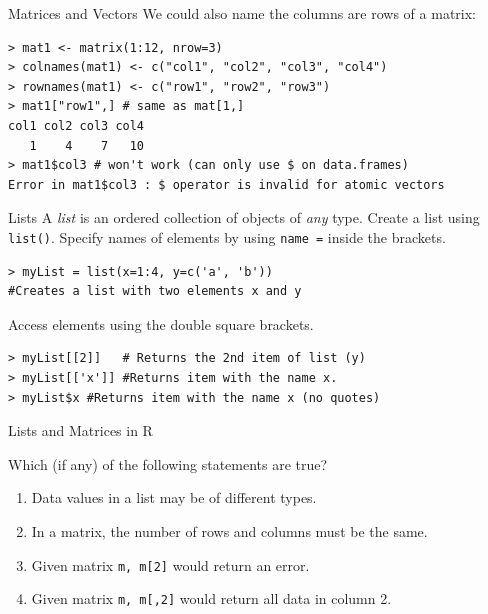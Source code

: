 \documentclass[xcolor=svgnames, 10pt, handout]{beamer}
\begin{document}
\begin{frame}[fragile]{Matrices and Vectors}
We could also name the columns are rows of a matrix:
\begin{Verbatim}[commandchars=\\\{\}, xleftmargin=2em]
> mat1 <- matrix(1:12, nrow=3)
> colnames(mat1) <- c("col1", "col2", "col3", "col4")
> rownames(mat1) <- c("row1", "row2", "row3")
> mat1["row1",] # same as mat[1,]
col1 col2 col3 col4 
   1    4    7   10 
> mat1$col3 # won't work (can only use $ on data.frames)
Error in mat1$col3 : $ operator is invalid for atomic vectors
\end{Verbatim}
\end{frame}


\begin{frame}[fragile]{Lists}
A \emph{list} is an ordered collection of objects of \emph{any} type.
\vfill
Create a list using \texttt{list()}.  Specify names of elements by using \texttt{name =} inside the brackets.
\begin{Verbatim}[commandchars=\\\{\}, xleftmargin=2em]
> myList = list(x=1:4, y=c('a', 'b'))
#Creates a list with two elements x and y
\end{Verbatim}
\vfill
Access elements using the double square brackets.
\begin{Verbatim}[commandchars=\\\{\}, xleftmargin=2em]
> myList[[2]]   # Returns the 2nd item of list (y)
> myList[['x']] #Returns item with the name x.
> myList$x #Returns item with the name x (no quotes)
\end{Verbatim}
\end{frame}


\begin{frame}[fragile]{Lists and Matrices in R}
\begin{question}
Which (if any) of the following statements are true?
\begin{enumerate}
\item Data values in a list may be of different types. \onslide<+-> \pcmark 
\item In a matrix, the number of rows and columns must be the same. \pxmark
\item Given matrix \texttt{m, m[2]} would return an error. \pxmark 
\item Given matrix \texttt{m, m[,2]} would return all data in column 2. \pcmark
\end{enumerate}
\end{question}
\end{frame}
\end{document}
